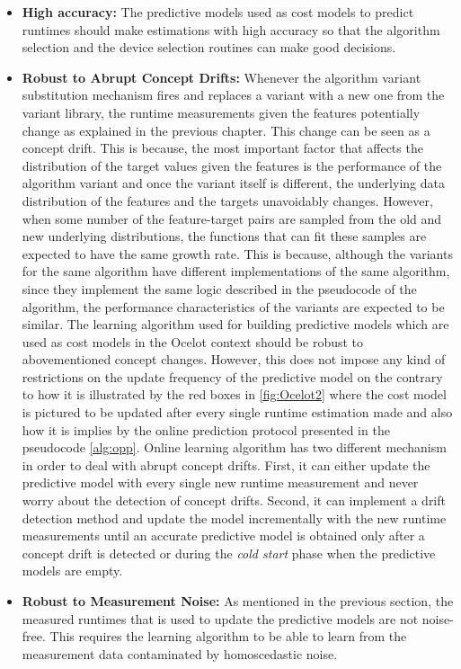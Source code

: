 \begin{itemize}
\label{list:restimator_requirements}

\item \textbf{High accuracy:} The predictive models used as cost models to predict runtimes should make estimations with high accuracy so that the algorithm selection and the device selection routines can make good decisions.
\item \textbf{Robust to Abrupt Concept Drifts:} Whenever the algorithm variant substitution mechanism fires and replaces a variant with a new one from the variant library, the runtime measurements given the features potentially change as explained in the previous chapter. This change can be seen as a concept drift. This is because, the most important factor that affects the distribution of the target values given the features is the performance of the algorithm variant and once the variant itself is different, the underlying data distribution of the features and the targets unavoidably changes. However, when some number of the feature-target pairs are sampled from the old and new underlying distributions, the functions that can fit these samples are expected to have the same growth rate. This is because, although the variants for the same algorithm have different implementations of the same algorithm, since they implement the same logic described in the pseudocode of the algorithm, the performance characteristics of the variants are expected to be similar. 
The learning algorithm used for building predictive models which are used as cost models in the Ocelot context should be robust to abovementioned concept changes. However, this does not impose any kind of restrictions on the update frequency of the predictive model on the contrary to how it is illustrated by the red boxes in \ref{fig:Ocelot2} where the cost model is pictured to be updated after every single runtime estimation made and also how it is implies by the online prediction protocol presented in the pseudocode \ref{alg:opp}. Online learning algorithm has two different mechanism in order to deal with abrupt concept drifts. First, it can either update the predictive model with every single new runtime measurement and never worry about the detection of concept drifts. Second, it can implement a drift detection method and update the model incrementally with the new runtime measurements until an accurate predictive model is obtained only after a concept drift is detected or during the \textit{cold start} phase when the predictive models are empty.
\item \textbf{Robust to Measurement Noise:} As mentioned in the previous section, the measured runtimes that is used to update the predictive models are not noise-free. This requires the learning algorithm to be able to learn from the measurement data contaminated by homoscedastic noise. 

\end{itemize}
